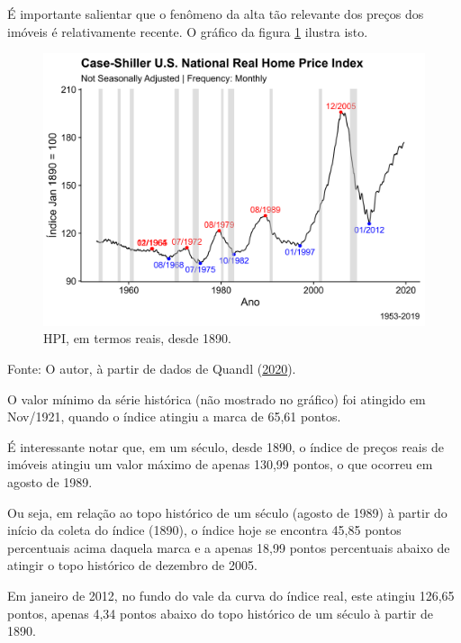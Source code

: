 \documentclass[
	12pt,				%
	oneside,			%
	a4paper,			%
	chapter=TITLE,		%
	section=TITLE,		%
	english,			%
	brazil				%
	]{abntex2}
\newcommand{\bcenter}{\begin{center}}
\newcommand{\ecenter}{\end{center}}
\begin{document}
É importante salientar que o fenômeno da alta tão relevante dos preços dos
imóveis é relativamente recente. O gráfico da figura \ref{fig:rhpi2} ilustra
isto.
\begin{figure}[H]

{\centering \includegraphics[width=0.7\linewidth]{images/rhpi2-1} 

}

\caption{HPI, em termos reais, desde 1890.}\label{fig:rhpi2}
\end{figure}
\bcenter

Fonte: O autor, à partir de dados de Quandl (\protect\hyperlink{ref-QuandlWIKI}{2020}).
\ecenter

O valor mínimo da série histórica (não mostrado no gráfico) foi atingido em\\
Nov/1921, quando o índice atingiu a marca
de 65,61 pontos.

É interessante notar que, em um século, desde 1890, o índice de preços reais de
imóveis atingiu um valor máximo de apenas
130,99 pontos, o
que ocorreu em agosto de 1989.

Ou seja, em relação ao topo histórico de um século (agosto de 1989) à partir do
início da coleta do índice (1890), o índice hoje se encontra
45,85
pontos percentuais acima daquela marca e a apenas
18,99
pontos percentuais abaixo de atingir o topo histórico de dezembro de 2005.

Em janeiro de 2012, no fundo do vale da curva do índice real, este atingiu
126,65 pontos,
apenas 4,34 pontos abaixo do topo histórico
de um século à partir de 1890.
\end{document}
